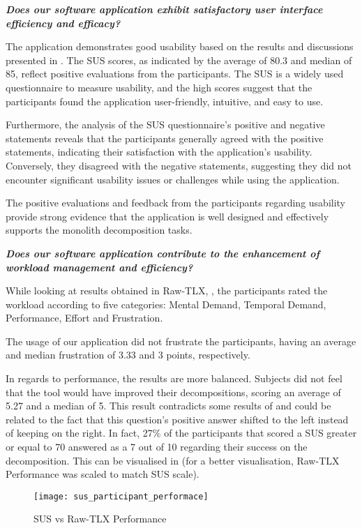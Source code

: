 \textbf{\emph{Does our software application exhibit satisfactory user interface
efficiency and efficacy?}}

The application demonstrates good usability based on the results and
discussions presented in . The SUS scores, as indicated by the
average of 80.3 and median of 85, reflect positive evaluations from the
participants. The SUS is a widely used questionnaire to measure usability, and
the high scores suggest that the participants found the application
user-friendly, intuitive, and easy to use.

Furthermore, the analysis of the SUS questionnaire's positive and negative
statements reveals that the participants generally agreed with the positive
statements, indicating their satisfaction with the application's usability.
Conversely, they disagreed with the negative statements, suggesting they did
not encounter significant usability issues or challenges while using the
application.

The positive evaluations and feedback from the participants regarding usability
provide strong evidence that the application is well designed and effectively
supports the monolith decomposition tasks.

\textbf{\emph{Does our software application contribute to the enhancement of
workload management and efficiency?}}

While looking at results obtained in Raw-TLX, , the
participants rated the workload according to five categories: Mental Demand,
Temporal Demand, Performance, Effort and Frustration.

The usage of our application did not frustrate the participants, having an
average and median frustration of 3.33 and 3 points, respectively.

In regards to performance, the results are more balanced. Subjects did not feel
that the tool would have improved their decompositions, scoring an average of
5.27 and a median of 5. This result contradicts some results of 
and could be related to the fact that this question's positive answer shifted
to the left instead of keeping on the right. In fact, 27\% of the
participants that scored a SUS greater or equal to 70 answered as a 7 out of 10
regarding their success on the decomposition. This can be visualised in
 (for a better visualisation, Raw-TLX
Performance was scaled to match SUS scale).

\begin{figure*}[!htb]
  \centering
  \texttt{[image: sus\_participant\_performace]}
  \caption{SUS vs Raw-TLX Performance}
  \label{fig:sus_participant_performance}
\end{figure*}

